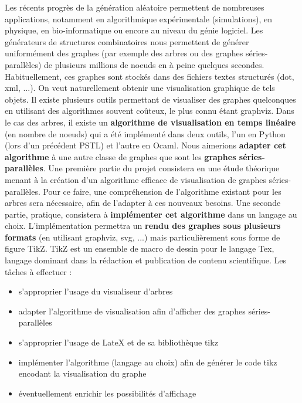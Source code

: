 \documentclass[11pt]{article}
\begin{document}
Les récents progrès de la génération aléatoire permettent de nombreuses applications, notamment en algorithmique expérimentale (simulations), en physique, en bio-informatique ou encore au niveau du génie logiciel. Les générateurs de structures combinatoires nous permettent de générer uniformément des graphes (par exemple des arbres ou des graphes séries-parallèles) de plusieurs millions de noeuds en à peine quelques secondes. Habituellement, ces graphes sont stockés dans des fichiers textes structurés (dot, xml, ...). On veut naturellement obtenir une visualisation graphique de tels objets.
\newline
Il existe plusieurs outils permettant de visualiser des graphes quelconques en utilisant des algorithmes souvent coûteux, le plus connu étant graphviz. Dans le cas des arbres, il existe un \textbf{algorithme de visualisation en temps linéaire} (en nombre de noeuds) qui a été implémenté dans deux outils, l’un en Python (lors d’un précédent PSTL) et l’autre en Ocaml. Nous aimerions \textbf{adapter cet algorithme} à une autre classe de graphes que sont les \textbf{graphes séries-parallèles}. Une première partie du projet consistera en une étude théorique menant à la création d’un algorithme efficace de visualisation de graphes séries-parallèles. Pour ce faire, une compréhension de l’algorithme existant pour les arbres sera nécessaire, afin de l’adapter à ces nouveaux besoins. Une seconde partie, pratique, consistera à \textbf{implémenter cet algorithme} dans un langage au choix. L’implémentation permettra un \textbf{rendu des graphes sous plusieurs formats} (en utilisant graphviz, svg, ...) mais particulièrement sous forme de figure TikZ. TikZ est un ensemble de macro de dessin pour le langage Tex, langage dominant dans la rédaction et publication de contenu scientifique.
\newline
\newline
Les tâches à effectuer :
\begin{itemize}
    \item s’approprier l’usage du visualiseur d’arbres 
    \item adapter l’algorithme de visualisation afin d’afficher des graphes séries-parallèles 
    \item s’approprier l’usage de LateX et de sa bibliothèque tikz 
    \item implémenter l’algorithme (langage au choix) afin de générer le code tikz encodant la visualisation du graphe
    \item éventuellement enrichir les possibilités d’affichage
\end{itemize}
\end{document}
